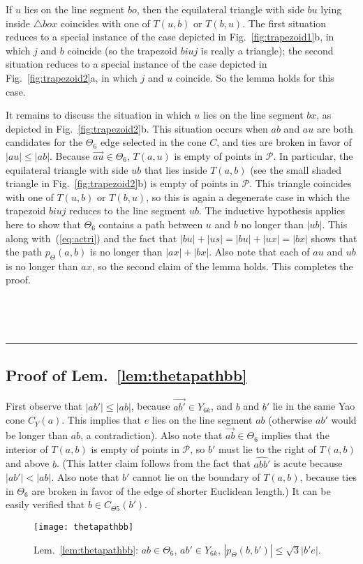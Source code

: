 \documentclass[11pt]{article}
\newcommand\cone{{C}}
\newcommand\Pt{\mathcal P}
\newcommand\ang[1]{\widehat{#1}}
\newcommand{\arr}[1]{\overrightarrow{#1}}
\newcommand{\qed}{\rule{0.5em}{1.5ex}}
\newcommand{\fqed}{{\hfill~\qed}}
\newcommand{\eproof}{{\hfill~\fqed} \vspace{1em}}
\begin{document}
If $u$ lies on the line segment $bo$, then the equilateral triangle with side $bu$ lying inside $\triangle box$ coincides with one of $T(u, b)$ or $T(b, u)$. The first situation reduces to a special instance of the case depicted in Fig.~\ref{fig:trapezoid1}b, in which $j$ and $b$ coincide (so the trapezoid $biuj$ is really a triangle); the second situation reduces to a special instance of the case depicted in Fig.~\ref{fig:trapezoid2}a, in which $j$ and $u$ coincide. So the lemma holds for this case.

It remains to discuss the situation in which $u$ lies on the line segment $bx$, as depicted in Fig.~\ref{fig:trapezoid2}b. This situation occurs when $ab$ and $au$ are both candidates for the $\Theta_6$ edge selected in the cone $\cone$, and ties are broken in favor of $|au| \le |ab|$. Because $\arr{au} \in \Theta_6$, $T(a,u)$ is empty of points in $\Pt$. In particular, the equilateral triangle with side $ub$ that lies inside $T(a, b)$ (see the small shaded triangle in Fig.~\ref{fig:trapezoid2}b) is empty of points in $\Pt$. This triangle coincides with one of $T(u, b)$ or $T(b, u)$, so this is again a degenerate case in which the trapezoid $biuj$  reduces to the line segment $ub$. The inductive hypothesis applies here to show that $\Theta_6$ contains a path between $u$ and $b$ no longer than $|ub|$. This along with~(\ref{eq:actri}) and the fact that $|bu| + |us| = |bu| + |ux| = |bx|$ shows that the path $p_\Theta(a, b)$ is no longer than $|ax| + |bx|$. Also note that each of $au$ and $ub$ is no longer than $ax$, so the second claim of the lemma holds. This completes the proof.
\eproof

\subsection{Proof of Lem.~\ref{lem:thetapathbb}}


First observe that $|ab'| \le |ab|$, because $\arr{ab'} \in Y_{6k}$, and $b$ and $b'$ lie in the same Yao cone $\cone_Y(a)$. This implies that $e$ lies on the line segment $ab$ (otherwise $ab'$ would be longer than $ab$, a contradiction). Also note that $\arr{ab} \in \Theta_6$ implies that the interior of $T(a,b)$ is empty of points in $\Pt$, so $b'$ must lie to the right of $T(a, b)$ and above $b$. (This latter claim follows from the fact that
$\ang{abb'}$ is acute because $|ab'| < |ab|$. Also note that $b'$ cannot lie on the boundary of $T(a, b)$, because ties in $\Theta_6$ are broken in favor of the edge of shorter Euclidean length.) It can be easily verified that $b \in \cone_{\Theta5}(b')$.
\begin{figure}[htpb]
\centering
\texttt{[image: thetapathbb]}
\caption{Lem.~\ref{lem:thetapathbb}: $ab \in \Theta_6$, $ab' \in Y_{6k}$, $|p_\Theta(b,b')| \le \sqrt{3}|b'e|$.}
\label{fig:thetapathbb}
\end{figure}
\end{document}
